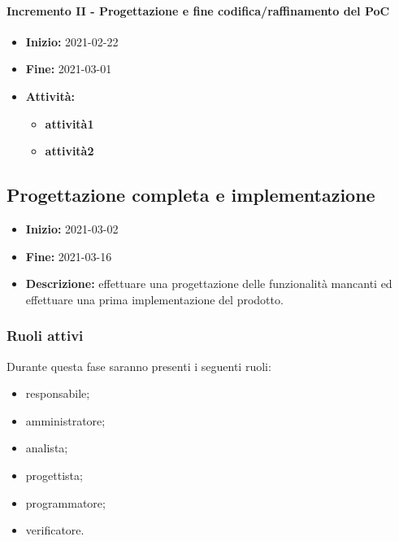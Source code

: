\paragraph[Incremento II]{Incremento II - \textnormal{Progettazione e fine codifica/raffinamento del PoC}}
\begin{itemize}
    \item [] \textbf{Inizio:} 2021-02-22
    \item [] \textbf{Fine:} 2021-03-01
    \item [] \textbf{Attività:}
          \begin{itemize}
              \item \textbf{attività1}
              \item \textbf{attività2}
          \end{itemize}
\end{itemize}


\subsection{Progettazione completa e implementazione} \label{_pianificazioneProgettazioneCompletaImplementazione}
\begin{itemize}
    \item []\textbf{Inizio:} 2021-03-02
    \item []\textbf{Fine:} 2021-03-16
    \item []\textbf{Descrizione:} effettuare una progettazione delle funzionalità mancanti ed effettuare una prima implementazione del prodotto.
\end{itemize}

\subsubsection{Ruoli attivi}
Durante questa fase saranno presenti i seguenti ruoli:
\begin{itemize}
    \item responsabile;
    \item amministratore;
    \item analista;
    \item progettista;
    \item programmatore;
    \item verificatore.
\end{itemize}

